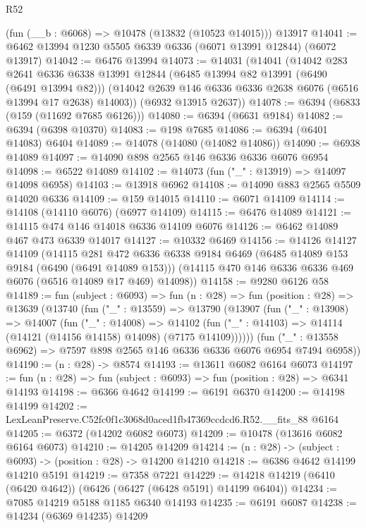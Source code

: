 \begin{lexlean}{R52}
\begin{coremodule}
    (fun (__b : @6068) => @10478 (@13832 (@10523 @14015)))
    @13917
@14041 := @6462 @13994 @1230 @5505 @6339 @6336 (@6071 @13991 @12844) (@6072 @13917)
@14042 := @6476 @13994
@14073 := @14031
    (@14041
      (@14042
        @283
        @2641
        @6336
        @6338
        @13991
        @12844
        (@6485 @13994 @82 @13991 (@6490 (@6491 @13994 @82)))
        (@14042 @2639 @146 @6336 @6336 @2638 @6076 (@6516 @13994 @17 @2638) @14003))
      (@6932 @13915 @2637))
@14078 := @6394 (@6833 (@159 (@11692 @7685 @6126)))
@14080 := @6394 (@6631 @9184)
@14082 := @6394 (@6398 @10370)
@14083 := @198 @7685
@14086 := @6394 (@6401 @14083) @6404
@14089 := @14078 (@14080 (@14082 @14086))
@14090 := @6938 @14089
@14097 := @14090 @898 @2565 @146 @6336 @6336 @6076 @6954
@14098 := @6522 @14089
@14102 := @14073 (fun ("_" : @13919) => @14097 @14098 @6958)
@14103 := @13918 @6962
@14108 := @14090 @883 @2565 @5509 @14020 @6336
@14109 := @159 @14015
@14110 := @6071 @14109
@14114 := @14108 (@14110 @6076) (@6977 @14109)
@14115 := @6476 @14089
@14121 := @14115 @474 @146 @14018 @6336 @14109 @6076
@14126 := @6462 @14089 @467 @473 @6339 @14017
@14127 := @10332 @6469
@14156 := @14126
    @14127
    @14109
    (@14115
      @281
      @472
      @6336
      @6338
      @9184
      @6469
      (@6485 @14089 @153 @9184 (@6490 (@6491 @14089 @153)))
      (@14115 @470 @146 @6336 @6336 @469 @6076 (@6516 @14089 @17 @469) @14098))
@14158 := @9280 @6126 @58
@14189 := fun (subject : @6093) =>
  fun (n : @28) =>
  fun (position : @28) =>
  @13639
    (@13740
      (fun ("_" : @13559) =>
      @13790
        (@13907
          (fun ("_" : @13908) =>
          @14007
            (fun ("_" : @14008) =>
            @14102 (fun ("_" : @14103) => @14114 (@14121 (@14156 @14158) @14098) (@7175 @14109))))))
      (fun ("_" : @13558 @6962) => @7597 @898 @2565 @146 @6336 @6336 @6076 @6954 @7494 @6958))
@14190 := (n : @28) -> @8574
@14193 := @13611 @6082 @6164 @6073
@14197 := fun (n : @28) => fun (subject : @6093) => fun (position : @28) => @6341 @14193
@14198 := @6366 @4642
@14199 := @6191 @6370
@14200 := @14198 @14199
@14202 := LexLeanPreserve.C52fc0f1c3068d0aced1fb47369ccdcd6.R52.__fits_88 @6164
@14205 := @6372 (@14202 @6082 @6073)
@14209 := @10478 (@13616 @6082 @6164 @6073)
@14210 := @14205 @14209
@14214 := (n : @28) -> (subject : @6093) -> (position : @28) -> @14200 @14210
@14218 := @6386 @4642 @14199 @14210 @5191
@14219 := @7358 @7221
@14229 := @14218 @14219 (@6410 (@6420 @4642)) (@6426 (@6427 (@6428 @5191) @14199 @6404))
@14234 := @7085 @14219 @5188 @1185 @6340 @14193
@14235 := @6191 @6087
@14238 := @14234 (@6369 @14235) @14209

\end{coremodule}
\end{lexlean}
